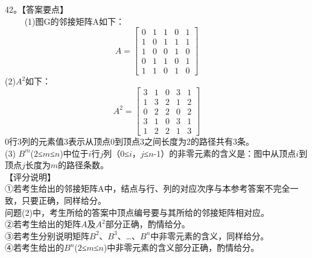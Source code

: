 42。【答案要点】 \\
$\qquad$ (1)图G的邻接矩阵A如下： \\
\begin{equation}
A=
\begin{bmatrix}
 0 & 1 & 1 & 0 & 1 \\
 1 & 0 & 1 & 1 & 1 \\
 1 & 0 & 0 & 1 & 0 \\
 0 & 1 & 1 & 0 & 1 \\
 1 & 1 & 0 & 1 & 0 
\end{bmatrix}
\end{equation}
(2)$A^2$如下：\\
\begin{equation}
A^2=
\begin{bmatrix}
 3 & 1 & 0 & 3 & 1 \\
 1 & 3 & 2 & 1 & 2 \\
 0 & 2 & 2 & 0 & 2 \\
 3 & 1 & 0 & 3 & 1 \\
 1 & 2 & 2 & 1 & 3 
\end{bmatrix}
\end{equation}
0行3列的元素值3表示从顶点0到顶点3之间长度为2的路径共有3条。\\
(3) $B^m$($2$≤$m$≤$n$)中位于$i$行$j$列（$0$≤$i$，$j$≤$n$-$1$）的非零元素的含义是：图中从顶点$i$到顶点$j$长度为$m$的路径条数。\\
【评分说明】\\
①若考生给出的邻接矩阵A中，结点与行、列的对应次序与本参考答案不完全一致，只要正确，同样给分。\\
问题(2)中，考生所给的答案中顶点编号要与其所给的邻接矩阵相对应。\\
②若考生给出的矩阵$A$及$A^2$部分正确，酌情给分。\\
③若考生分别说明矩阵$B^2$、$B^3$、…、$B^n$中非零元素的含义，同样给分。\\
④若考生给出的$B^n$($2$≤$m$≤$n$)中非零元素的含义部分正确，酌情给分。

